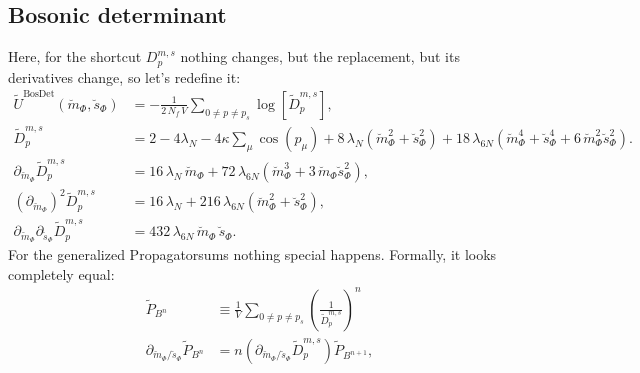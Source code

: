\subsection*{Bosonic determinant}
Here, for the shortcut $D_p^{m,s}$ nothing changes, but the replacement, but its derivatives change, so let's redefine it:
 \begin{align}\label{eq:CEP_bosonicDeterminantContribution_shortcut_rescaled}
  \tilde U^{\text{BosDet}}(\breve m_{\Phi},\breve s_{\Phi}) &= - \frac{1}{2\,N_f\,V}\sum\limits_{0 \neq p \neq p_s} \log \left[ \tilde D_p^{m,s} \right],
       \nonumber \\
   \tilde D_p^{m,s}  &=  2 - 4 \lambda_N - 4 \kappa \sum_{\mu} \cos(p_{\mu}) + 8\, \lambda_N \left(\breve m_{\Phi}^2 + \breve s_{\Phi}^2 \right) 
                                        + 18\, \lambda_{6N}\left( \breve m_{\Phi}^4 + \breve s_{\Phi}^4 + 6\,  \breve m_{\Phi}^2 \breve s_{\Phi}^2 \right).
%                                         
       \\ \label{eq:CEP_derivativeShortcutD_dm_rescaled}
   \partial_{\breve m_{\Phi}}  \tilde D_p^{m,s} & = 
                                          16\, \lambda_N\,  \breve m_{\Phi}  + 72\,\lambda_{6N} \left( \breve m_{\Phi}^3 + 3\, \breve m_{\Phi} \breve s_{\Phi}^2 \right),
%                                           
         \\ \label{eq:CEP_derivativeShortcutD_dmdm_rescaled}
 \left(\partial_{\breve m_{\Phi}}\right)^2  \tilde D_p^{m,s} & = 
                                          16\, \lambda_N + 216\,\lambda_{6N} \left( \breve m_{\Phi}^2 + \breve s_{\Phi}^2 \right),
%                                           
         \\ \label{eq:CEP_derivativeShortcutD_dmds_rescaled}
 \partial_{\breve m_{\Phi}} \partial_{\breve s_{\Phi}} \tilde D_p^{m,s} & = 432\,\lambda_{6N} \, \breve m_{\Phi}\, \breve s_{\Phi}.
 \end{align}
%  
For the generalized Propagatorsums nothing special happens. Formally, it looks completely equal:
\begin{align}\label{eq:def_powersOfPropSumWithDerivative_rescaled}
 \tilde P_{B^n} & \equiv \frac{1}{V}\sum\limits_{0\neq p\neq p_s} \left(\frac{1}{ \tilde D_p^{m,s}}\right)^n
           \\ \label{eq:derivative_Of_P_Bn_rescaled}
 \partial_{\breve m_{\Phi}/\breve s_{\Phi}} \tilde P_{B^n} & = n \left( \partial_{\breve m_{\Phi}/\breve s_{\Phi}} \tilde D_p^{m,s} \right) \tilde P_{B^{n+1}},
\end{align}
